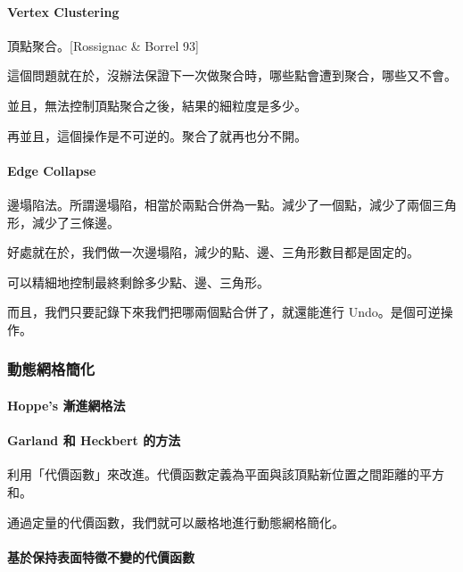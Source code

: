 \documentclass[
]{article}
\begin{document}
\hypertarget{header-n53}{%
\paragraph{Vertex Clustering}\label{header-n53}}

頂點聚合。{[}Rossignac \& Borrel 93{]}

這個問題就在於，沒辦法保證下一次做聚合時，哪些點會遭到聚合，哪些又不會。

並且，無法控制頂點聚合之後，結果的細粒度是多少。

再並且，這個操作是不可逆的。聚合了就再也分不開。

\hypertarget{header-n58}{%
\paragraph{Edge Collapse}\label{header-n58}}

邊塌陷法。所謂邊塌陷，相當於兩點合併為一點。減少了一個點，減少了兩個三角形，減少了三條邊。

好處就在於，我們做一次邊塌陷，減少的點、邊、三角形數目都是固定的。

可以精細地控制最終剩餘多少點、邊、三角形。

而且，我們只要記錄下來我們把哪兩個點合併了，就還能進行
Undo。是個可逆操作。

\hypertarget{header-n63}{%
\subsubsection{動態網格簡化}\label{header-n63}}

\hypertarget{header-n64}{%
\paragraph{Hoppe's 漸進網格法}\label{header-n64}}

\hypertarget{header-n65}{%
\paragraph{Garland 和 Heckbert 的方法}\label{header-n65}}

利用「代價函數」來改進。代價函數定義為平面與該頂點新位置之間距離的平方和。

通過定量的代價函數，我們就可以嚴格地進行動態網格簡化。

\hypertarget{header-n68}{%
\paragraph{基於保持表面特徵不變的代價函數}\label{header-n68}}
\end{document}
